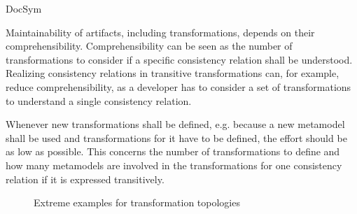 \begin{copiedFrom}{DocSym}
\begin{description}[leftmargin=\parindent]
\item[Comprehensibility]
Maintainability of artifacts, including transformations, depends on their comprehensibility.
Comprehensibility can be seen as the number of transformations to consider if a specific consistency relation shall be understood.
Realizing consistency relations in transitive transformations can, for example, reduce comprehensibility, as a developer has to consider a set of transformations to understand a single consistency relation. 

\item[Evolvability]
Whenever new transformations shall be defined, e.g. because a new metamodel shall be used and transformations for it have to be defined, the effort should be as low as possible.
This concerns the number of transformations to define and how many metamodels are involved in the transformations for one consistency relation if it is expressed transitively.
\end{description}


\begin{figure}[b]
    \centering
    \begin{minipage}[b]{0.4\columnwidth}
        \centering
        
        \label{fig:properties:topologies:full}
    \end{minipage}
    \hspace{2em}
    \begin{minipage}[b]{0.4\columnwidth}
        \centering
        
        \vspace{1em}
        \label{fig:properties:topologies:tree}
    \end{minipage}
    \caption{Extreme examples for transformation topologies}
    \label{fig:properties:topologies}
\end{figure}


\end{copiedFrom}
